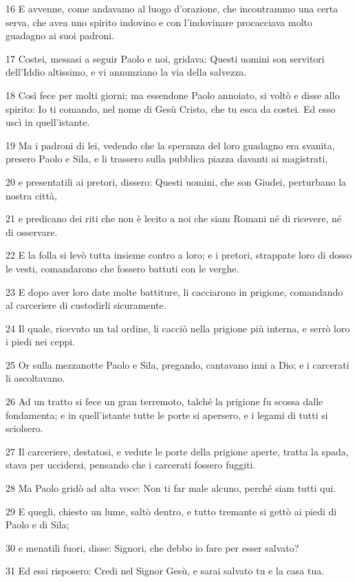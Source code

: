 \par 16 E avvenne, come andavamo al luogo d'orazione, che incontrammo una certa serva, che avea uno spirito indovino e con l'indovinare procacciava molto guadagno ai suoi padroni.
\par 17 Costei, messasi a seguir Paolo e noi, gridava: Questi uomini son servitori dell'Iddio altissimo, e vi annunziano la via della salvezza.
\par 18 Così fece per molti giorni; ma essendone Paolo annoiato, si voltò e disse allo spirito: Io ti comando, nel nome di Gesù Cristo, che tu esca da costei. Ed esso uscì in quell'istante.
\par 19 Ma i padroni di lei, vedendo che la speranza del loro guadagno era svanita, presero Paolo e Sila, e li trassero sulla pubblica piazza davanti ai magistrati,
\par 20 e presentatili ai pretori, dissero: Questi uomini, che son Giudei, perturbano la nostra città,
\par 21 e predicano dei riti che non è lecito a noi che siam Romani né di ricevere, né di osservare.
\par 22 E la folla si levò tutta insieme contro a loro; e i pretori, strappate loro di dosso le vesti, comandarono che fossero battuti con le verghe.
\par 23 E dopo aver loro date molte battiture, li cacciarono in prigione, comandando al carceriere di custodirli sicuramente.
\par 24 Il quale, ricevuto un tal ordine, li cacciò nella prigione più interna, e serrò loro i piedi nei ceppi.
\par 25 Or sulla mezzanotte Paolo e Sila, pregando, cantavano inni a Dio; e i carcerati li ascoltavano.
\par 26 Ad un tratto si fece un gran terremoto, talché la prigione fu scossa dalle fondamenta; e in quell'istante tutte le porte si apersero, e i legami di tutti si sciolsero.
\par 27 Il carceriere, destatosi, e vedute le porte della prigione aperte, tratta la spada, stava per uccidersi, pensando che i carcerati fossero fuggiti.
\par 28 Ma Paolo gridò ad alta voce: Non ti far male alcuno, perché siam tutti qui.
\par 29 E quegli, chiesto un lume, saltò dentro, e tutto tremante si gettò ai piedi di Paolo e di Sila;
\par 30 e menatili fuori, disse: Signori, che debbo io fare per esser salvato?
\par 31 Ed essi risposero: Credi nel Signor Gesù, e sarai salvato tu e la casa tua.
